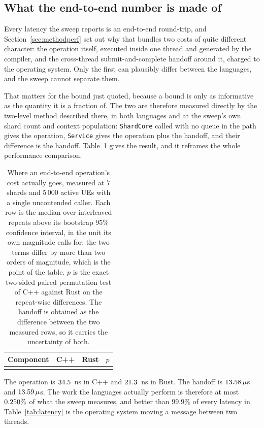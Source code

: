 \documentclass[english,twoside,openright,a4paper,censored,csm,software-track-2020]{HYthesisML}
\begin{document}
\subsection{What the end-to-end number is made of}\label{sec:budget}
Every latency the sweep reports is an end-to-end round-trip, and
Section~\ref{sec:methodperf} set out why that bundles two costs of quite different character:
the operation itself, executed inside one thread and generated by the compiler, and the
cross-thread submit-and-complete handoff around it, charged to the operating system. Only the
first can plausibly differ between the languages, and the sweep cannot separate them.

That matters for the bound just quoted, because a bound is only as informative as the quantity
it is a fraction of. The two are therefore measured directly by the two-level method described
there, in both languages and at the sweep's own shard count and context population:
\texttt{ShardCore} called with no queue in the path gives the operation, \texttt{Service} gives
the operation plus the handoff, and their difference is the handoff.
Table~\ref{tab:budget} gives the result, and it reframes the whole performance comparison.

\begin{table}[H]
\centering
\small
\caption[Where an end-to-end operation's cost actually goes]{Where an end-to-end operation's cost actually goes, measured at $7$ shards and
$5\,000$ active UEs with a single uncontended caller. Each row is the median over
\BudgetRepeats{} interleaved repeats above its bootstrap $95\%$ confidence interval, in the
unit its own magnitude calls for: the two terms differ by more than two orders of magnitude,
which is the point of the table. $p$ is the exact two-sided paired permutation test of C++
against Rust on the repeat-wise differences. The handoff is obtained as the difference between
the two measured rows, so it carries the uncertainty of both.\label{tab:budget}}
\begin{tabular}{@{}l r r r@{}}
\hline\hline
Component & C++ & Rust & $p$ \\
\hline
\\
\hline
\end{tabular}
\end{table}

The operation is $34.5$~ns in C++ and $21.3$~ns in Rust. The handoff is
$13.58\,\mu$s and $13.59\,\mu$s. The work the languages actually
perform is therefore at most $0.250\%$ of what the sweep measures, and better
than $99.9\%$ of every latency in Table~\ref{tab:latency} is the operating system moving a
message between two threads.
\end{document}
